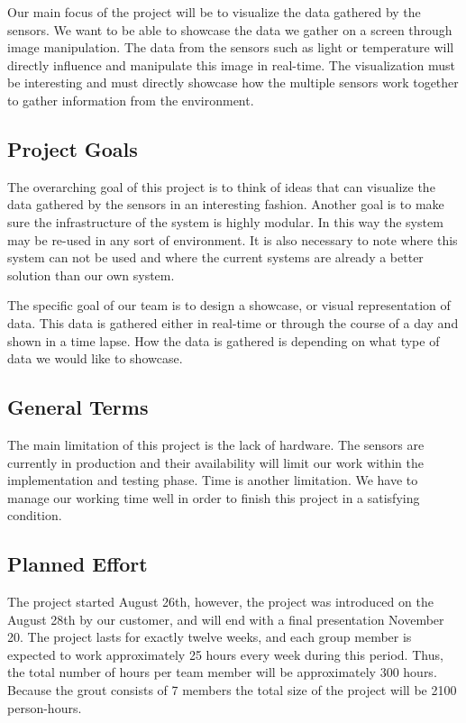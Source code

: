 \documentclass[../document.tex]{subfiles}
\begin{document}
Our main focus of the project will be to visualize the data gathered by the sensors. We want to be able to showcase the data we gather on a screen through image manipulation. The data from the sensors such as light or temperature will directly influence and manipulate this image in real-time. The visualization must be interesting and must directly showcase how the multiple sensors work together to gather information from the environment.

\subsection{Project Goals}
The overarching goal of this project is to think of ideas that can visualize the data gathered by the sensors in an interesting fashion. Another goal is to make sure the infrastructure of the system is highly modular. In this way the system may be re-used in any sort of environment. It is also necessary to note where this system can not be used and where the current systems are already a better solution than our own system.

The specific goal of our team is to design a showcase, or visual representation of data. This data is gathered either in real-time or through the course of a day and shown in a time lapse. How the data is gathered is depending on what type of data we would like to showcase. 

\subsection{General Terms}
The main limitation of this project is the lack of hardware. The sensors are currently in production and their availability will limit our work within the implementation and testing phase. Time is another limitation. We have to manage our working time well in order to finish this project in a satisfying condition.

\subsection{Planned Effort}
The project started August 26th, however, the project was introduced on the August 28th by our customer, and will end with a final presentation November 20. The project lasts for exactly twelve weeks, and each group member is expected to work approximately 25 hours every week during this period. Thus, the total number of hours per team member will be approximately 300 hours. Because the grout consists of 7 members the total size of the project will be 2100 person-hours. 
\end{document}
